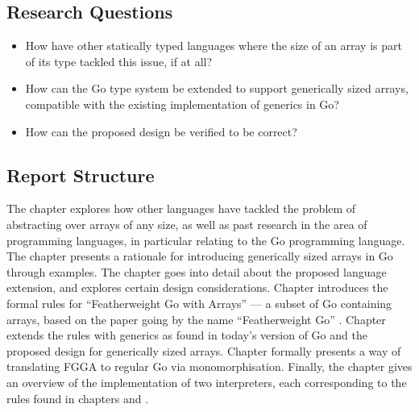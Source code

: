 \subsection{Research Questions}

\begin{itemize}
      \item How have other statically typed languages where the size of an array
            is part of its type tackled this issue, if at all?
      \item How can the Go type system be extended to support generically sized
            arrays, compatible with the existing implementation of generics in
            Go?
      \item How can the proposed design be verified to be correct?
\end{itemize}


\subsection{Report Structure}

The  chapter explores how
other languages have tackled the problem of abstracting over arrays of any size,
as well as past research in the area of programming languages, in particular
relating to the Go programming language. The
 chapter presents a rationale for
introducing generically sized arrays in Go through examples. The
 chapter goes into detail about the
proposed language extension, and explores certain design considerations. Chapter
 introduces the formal rules for ``Featherweight
Go with Arrays'' --- a subset of Go containing arrays, based on the paper going
by the name ``Featherweight Go'' \autocite{fg}. Chapter
 extends the rules with generics as found in
today's version of Go and the proposed design for generically sized arrays.
Chapter  formally presents a way of
translating FGGA to regular Go via monomorphisation. Finally, the
 chapter gives an overview of
the implementation of two interpreters, each corresponding to the rules found in
chapters  and .
